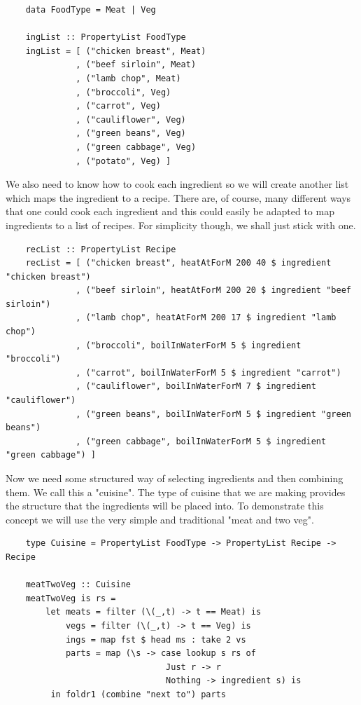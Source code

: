 \documentclass[11pt]{article}
\begin{document}
\begin{lstlisting}
    data FoodType = Meat | Veg

    ingList :: PropertyList FoodType
    ingList = [ ("chicken breast", Meat)
              , ("beef sirloin", Meat)
              , ("lamb chop", Meat)
              , ("broccoli", Veg)
              , ("carrot", Veg)
              , ("cauliflower", Veg)
              , ("green beans", Veg)
              , ("green cabbage", Veg)
              , ("potato", Veg) ]
\end{lstlisting}

We also need to know how to cook each ingredient so we will create another
list which maps the ingredient to a recipe. There are, of course, many different
ways that one could cook each ingredient and this could easily be adapted to
map ingredients to a list of recipes. For simplicity though, we shall just
stick with one.

\begin{lstlisting}
    recList :: PropertyList Recipe
    recList = [ ("chicken breast", heatAtForM 200 40 $ ingredient "chicken breast")
              , ("beef sirloin", heatAtForM 200 20 $ ingredient "beef sirloin")
              , ("lamb chop", heatAtForM 200 17 $ ingredient "lamb chop")
              , ("broccoli", boilInWaterForM 5 $ ingredient "broccoli")
              , ("carrot", boilInWaterForM 5 $ ingredient "carrot")
              , ("cauliflower", boilInWaterForM 7 $ ingredient "cauliflower")
              , ("green beans", boilInWaterForM 5 $ ingredient "green beans")
              , ("green cabbage", boilInWaterForM 5 $ ingredient "green cabbage") ]
\end{lstlisting}

Now we need some structured way of selecting ingredients and then combining
them. We call this a "cuisine". The type of cuisine that we are making provides
the structure that the ingredients will be placed into. To demonstrate this
concept we will use the very simple and traditional "meat and two veg".

\begin{lstlisting}
    type Cuisine = PropertyList FoodType -> PropertyList Recipe -> Recipe

    meatTwoVeg :: Cuisine
    meatTwoVeg is rs =
        let meats = filter (\(_,t) -> t == Meat) is
            vegs = filter (\(_,t) -> t == Veg) is
            ings = map fst $ head ms : take 2 vs
            parts = map (\s -> case lookup s rs of
                                Just r -> r
                                Nothing -> ingredient s) is
         in foldr1 (combine "next to") parts
\end{lstlisting}
\end{document}

